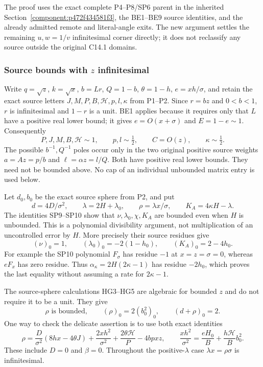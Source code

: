 The proof uses the exact complete P4--P8/SP6 parent in the inherited
Section~\ref{component:p472f434581f3}, the BE1--BE9 source identities, and the
already admitted remote and literal-angle exits. The new argument
settles the remaining $u,w=1/v$ infinitesimal corner directly; it does
not reclassify any source outside the original C14.1 domains.

\subsubsection*{Source bounds with $z$ infinitesimal}

Write $q=\sqrt z$, $k=\sqrt x$, $b=Lr$, $Q=1-b$,
$\theta=1-h$, $e=xh/\sigma$, and retain the exact source letters
$J,M,P,B,\mathcal H,p,l,\kappa$ from P1--P2. Since $r=bz$ and
$0<b<1$, $r$ is infinitesimal and $1-r$ is a unit. BE1 applies
because it requires only that $L$ have a positive real lower bound;
it gives $e=O(x+\sigma)$ and $E=1-e\sim1$. Consequently
\[
 P,J,M,B,\mathcal H\sim1,\qquad
 p,l\sim\tfrac12,\qquad C=O(z),\qquad\kappa\sim\tfrac12.
 \tag{SF1}
\]
The possible $b^{-1},Q^{-1}$ poles occur only in the two original
positive source weights $a=Az=p/b$ and $\ell=\alpha z=l/Q$.
Both have positive real lower bounds. They need not be bounded above.
No cap of an individual unbounded matrix entry is used below.

Let $d_0,b_0$ be the exact source sphere from P2, and put
\[
 d=4D/\sigma^2,\qquad
 \lambda=2H+\lambda_0,\qquad
 \rho=\lambda x/\sigma,\qquad
 K_A=4\kappa H-\lambda.
 \tag{SF2}
\]
The identities SP9--SP10 show that $\nu,\lambda_0,\chi,K_A$ are
bounded even when $H$ is unbounded. This is a polynomial
divisibility argument, not multiplication of an uncontrolled error
by $H$. More precisely their source residues give
\[
 (\nu)_0=1,\qquad (\lambda_0)_0=-2(1-h_0),\qquad
 (K_A)_0=2-4h_0.
 \tag{SF3}
\]
For example the SP10 polynomial $F_\sigma$ has residue $-1$ at
$x=z=\sigma=0$, whereas $eF_x$ has zero residue. Thus
$\alpha_\kappa=2H(2\kappa-1)$ has residue $-2h_0$, which proves
the last equality without assuming a rate for $2\kappa-1$.

The source-sphere calculations HG3--HG5 are algebraic for bounded
$z$ and do not require it to be a unit. They give
\[
 \rho\text{ is bounded},\qquad
 (\rho)_0=2(b_0^2)_0,\qquad (d+\rho)_0=2.
 \tag{SF4}
\]
One way to check the delicate assertion is to use both exact identities
\[
 \rho=\frac D{\sigma^2}(8hx-4\theta J)
       +\frac{2xh^2}{\sigma^2}
       +\frac{2\theta\mathcal H}{P}-4bpxz,
 \qquad
 \frac{xh^2}{\sigma^2}=\frac{eH_0}{B}
                         +\frac{h\mathcal H}{B}b_0^2.
 \tag{SF5}
\]
These include $D=0$ and $\beta=0$. Throughout the positive-$\lambda$
case $\lambda x=\rho\sigma$ is infinitesimal.

